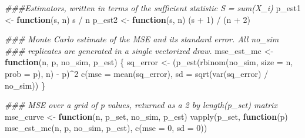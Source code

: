\documentclass[
  letterpaper,
  DIV=11,
  numbers=noendperiod]{scrreprt}
\newenvironment{Shaded}{\begin{snugshade}}{\end{snugshade}}
\newcommand{\AttributeTok}[1]{\textcolor[rgb]{0.40,0.45,0.13}{#1}}
\newcommand{\ControlFlowTok}[1]{\textcolor[rgb]{0.00,0.23,0.31}{\textbf{#1}}}
\newcommand{\DecValTok}[1]{\textcolor[rgb]{0.68,0.00,0.00}{#1}}
\newcommand{\DocumentationTok}[1]{\textcolor[rgb]{0.37,0.37,0.37}{\textit{#1}}}
\newcommand{\FunctionTok}[1]{\textcolor[rgb]{0.28,0.35,0.67}{#1}}
\newcommand{\NormalTok}[1]{\textcolor[rgb]{0.00,0.23,0.31}{#1}}
\newcommand{\OtherTok}[1]{\textcolor[rgb]{0.00,0.23,0.31}{#1}}
\newcommand{\SpecialCharTok}[1]{\textcolor[rgb]{0.37,0.37,0.37}{#1}}
\begin{document}
\begin{Shaded}
\begin{Highlighting}[]
\DocumentationTok{\#\#\#Estimators, written in terms of the sufficient statistic S = sum(X\_i)}
\NormalTok{p\_est1 }\OtherTok{\textless{}{-}} \ControlFlowTok{function}\NormalTok{(s, n) s }\SpecialCharTok{/}\NormalTok{ n}
\NormalTok{p\_est2 }\OtherTok{\textless{}{-}} \ControlFlowTok{function}\NormalTok{(s, n) (s }\SpecialCharTok{+} \DecValTok{1}\NormalTok{) }\SpecialCharTok{/}\NormalTok{ (n }\SpecialCharTok{+} \DecValTok{2}\NormalTok{)}

\DocumentationTok{\#\#\# Monte Carlo estimate of the MSE and its standard error.  All no\_sim}
\DocumentationTok{\#\#\# replicates are generated in a single vectorized draw.}
\NormalTok{mse\_est\_mc }\OtherTok{\textless{}{-}} \ControlFlowTok{function}\NormalTok{(n, p, no\_sim, p\_est)}
\NormalTok{\{}
\NormalTok{    sq\_error }\OtherTok{\textless{}{-}}\NormalTok{ (}\FunctionTok{p\_est}\NormalTok{(}\FunctionTok{rbinom}\NormalTok{(no\_sim, }\AttributeTok{size =}\NormalTok{ n, }\AttributeTok{prob =}\NormalTok{ p), n) }\SpecialCharTok{{-}}\NormalTok{ p)}\SpecialCharTok{\^{}}\DecValTok{2}
    \FunctionTok{c}\NormalTok{(}\AttributeTok{mse =} \FunctionTok{mean}\NormalTok{(sq\_error), }\AttributeTok{sd =} \FunctionTok{sqrt}\NormalTok{(}\FunctionTok{var}\NormalTok{(sq\_error) }\SpecialCharTok{/}\NormalTok{ no\_sim))}
\NormalTok{\}}

\DocumentationTok{\#\#\# MSE over a grid of p values, returned as a 2 by length(p\_set) matrix}
\NormalTok{mse\_curve }\OtherTok{\textless{}{-}} \ControlFlowTok{function}\NormalTok{(n, p\_set, no\_sim, p\_est)}
    \FunctionTok{vapply}\NormalTok{(p\_set, }\ControlFlowTok{function}\NormalTok{(p) }\FunctionTok{mse\_est\_mc}\NormalTok{(n, p, no\_sim, p\_est), }\FunctionTok{c}\NormalTok{(}\AttributeTok{mse =} \DecValTok{0}\NormalTok{, }\AttributeTok{sd =} \DecValTok{0}\NormalTok{))}
\end{Highlighting}
\end{Shaded}
\end{document}
